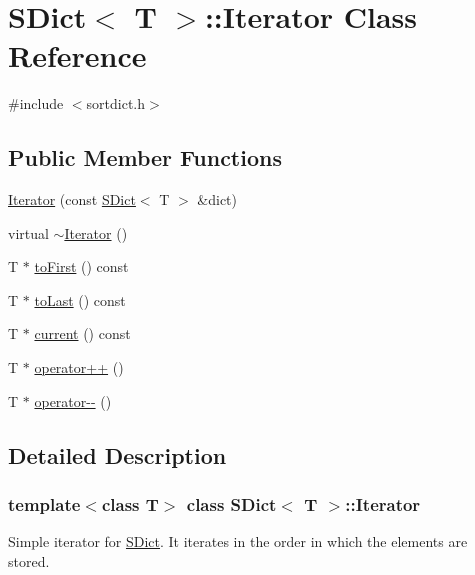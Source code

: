 \hypertarget{class_s_dict_1_1_iterator}{}\section{S\+Dict$<$ T $>$\+::Iterator Class Reference}
\label{class_s_dict_1_1_iterator}


{\ttfamily \#include $<$sortdict.\+h$>$}

\subsection*{Public Member Functions}
\begin{DoxyCompactItemize}
\item 
\mbox{\hyperlink{class_s_dict_1_1_iterator_a0c8bd359d5c6e57123216f52130b95bc}{Iterator}} (const \mbox{\hyperlink{class_s_dict}{S\+Dict}}$<$ T $>$ \&dict)
\item 
virtual \mbox{\hyperlink{class_s_dict_1_1_iterator_a2b2dc67f8c7bf160bba90c79083edcd2}{$\sim$\+Iterator}} ()
\item 
T $\ast$ \mbox{\hyperlink{class_s_dict_1_1_iterator_a94abefe0aa26d1f5c32ebeef13a69223}{to\+First}} () const
\item 
T $\ast$ \mbox{\hyperlink{class_s_dict_1_1_iterator_a5a634151c5aeccee715c26aceea155e3}{to\+Last}} () const
\item 
T $\ast$ \mbox{\hyperlink{class_s_dict_1_1_iterator_a62d45b651b54c3d65fb00cea644509af}{current}} () const
\item 
T $\ast$ \mbox{\hyperlink{class_s_dict_1_1_iterator_ab3172aa53d339348bab5208611044908}{operator++}} ()
\item 
T $\ast$ \mbox{\hyperlink{class_s_dict_1_1_iterator_ab660d0dacf804b314112c5ac9ea41714}{operator-\/-\/}} ()
\end{DoxyCompactItemize}


\subsection{Detailed Description}
\subsubsection*{template$<$class T$>$\newline
class S\+Dict$<$ T $>$\+::\+Iterator}

Simple iterator for \mbox{\hyperlink{class_s_dict}{S\+Dict}}. It iterates in the order in which the elements are stored. 

